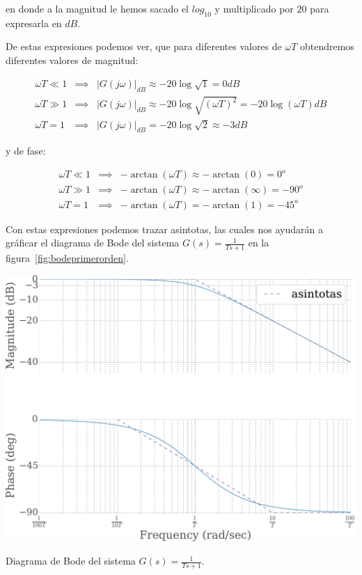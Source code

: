        en donde a la magnitud le hemos sacado el $log_{10}$ y multiplicado por $20$ para expresarla en $dB$.

        De estas expresiones podemos ver, que para diferentes valores de $\omega T$ obtendremos diferentes valores de magnitud:

        \begin{eqnarray*}
            \omega T \ll 1 & \implies & \left| G(j \omega) \right|_{dB} \approx -20 \log{\sqrt{1}} = 0 dB \\
            \omega T \gg 1 & \implies & \left| G(j \omega) \right|_{dB} \approx -20 \log{\sqrt{(\omega T)^2}} = -20 \log{(\omega T)} dB \\
            \omega T = 1 & \implies & \left| G(j \omega) \right|_{dB} = -20 \log{\sqrt{2}} \approx -3 dB
        \end{eqnarray*}

        y de fase:

        \begin{eqnarray*}
            \omega T \ll 1 & \implies & -\arctan{(\omega T)} \approx - \arctan{(0)} = 0^o \\
            \omega T \gg 1 & \implies & -\arctan{(\omega T)} \approx - \arctan{(\infty)} = -90^o \\
            \omega T = 1 & \implies & -\arctan{(\omega T)} = - \arctan{(1)} = -45^o
        \end{eqnarray*}

        Con estas expresiones podemos trazar asintotas,  las cuales nos ayudarán a gráficar el diagrama de Bode del sistema $G(s) = \frac{1}{Ts + 1}$ en la figura~\ref{fig:bodeprimerorden}.

        \begin{marginfigure}
            \centering
            \includegraphics[width=\textwidth]{./imagenes/bodeprimerorden.pdf}
            \caption{\label{fig:bodeprimerorden}Diagrama de Bode del sistema $G(s) = \frac{1}{Ts + 1}$.}
        \end{marginfigure}

